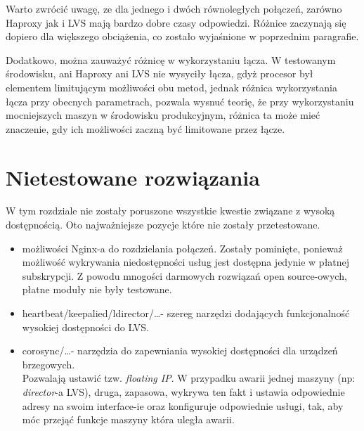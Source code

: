 Warto zwrócić uwagę, ze dla jednego i dwóch równoległych połączeń, zarówno Haproxy jak i LVS mają bardzo dobre czasy odpowiedzi.
Różnice zaczynają się dopiero dla większego obciążenia, co zostało wyjaśnione w poprzednim paragrafie.

Dodatkowo, można zauważyć różnicę w wykorzystaniu łącza.
W testowanym środowisku, ani Haproxy ani LVS nie wysyciły łącza, gdyż procesor był elementem limitującym możliwości obu metod, jednak różnica wykorzystania łącza przy obecnych parametrach, pozwala wysnuć teorię, że przy wykorzystaniu mocniejszych maszyn w środowisku produkcyjnym, różnica ta może mieć znaczenie, gdy ich możliwości zaczną być limitowane przez łącze.
\section{Nietestowane rozwiązania}
W tym rozdziale nie zostały poruszone wszystkie kwestie związane z wysoką dostępnością.
Oto najważniejsze pozycje które nie zostały przetestowane.
\begin{itemize}
	\item możliwości Nginx-a do rozdzielania połączeń.
		Zostały pominięte, ponieważ możliwość wykrywania niedostępności usług jest dostępna jedynie w płatnej subskrypcji. Z powodu mnogości darmowych rozwiązań open source-owych, płatne moduły nie były testowane.
	\item heartbeat/keepalied/ldirector/\ldots - szereg narzędzi dodających funkcjonalność wysokiej dostępności do LVS.
	\item corosync/\ldots - narzędzia do zapewniania wysokiej dostępności dla urządzeń brzegowych.\\
		Pozwalają ustawić tzw. \textit{floating IP}.
		W przypadku awarii jednej maszyny (np: \textit{director}-a LVS), druga, zapasowa, wykrywa ten fakt i ustawia odpowiednie adresy na swoim interface-ie oraz konfiguruje odpowiednie usługi, tak, aby móc przejąć funkcje maszyny która uległa awarii.
\end{itemize}
